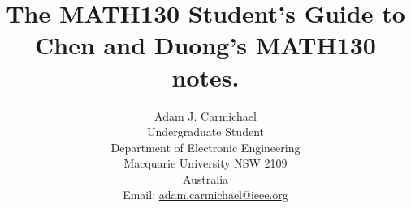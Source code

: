 \title{
  The MATH130 Student's Guide to Chen and Duong's MATH130 notes.
}
%
\author{
  Adam J. Carmichael \\
  Undergraduate Student \\
  Department of Electronic Engineering \\
  Macquarie University NSW 2109 \\
  Australia \\
  Email: \url{adam.carmichael@ieee.org}
}%
%

%
\maketitle
%


\tableofcontents

































%
